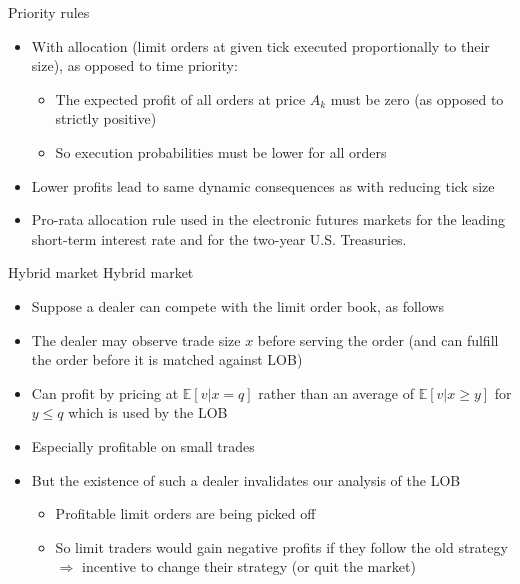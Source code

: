 \documentclass[english,10pt
,aspectratio=169
]{beamer}
\begin{document}
\begin{frame}{Priority rules}
	\begin{itemize}
		\item With  allocation (limit orders at given tick executed proportionally to their size), as opposed to \alert{time priority}:
		\begin{itemize}
			\item The expected profit of all orders at price $A_k$ must be zero (as opposed to strictly positive)
			\item So execution probabilities must be lower for all orders
		\end{itemize}
		\item Lower profits lead to same dynamic consequences as with reducing tick size
		\item Pro-rata allocation rule used in the electronic futures markets for the leading short-term interest rate and for the two-year U.S. Treasuries.
	\end{itemize}
\end{frame}


\begin{frame}{Hybrid market}
	Hybrid market
	\begin{itemize}
		\item Suppose a dealer can compete with the limit order book, as follows
		\item The dealer may observe trade size $x$ before serving the order (and can fulfill the order before it is matched against LOB)
		\item Can profit by pricing at $\mathbb{E}[v|x=q]$ rather than an average of $\mathbb{E}[v|x \geq y]$ for $y \leq q$ which is used by the LOB
		\item Especially profitable on small trades
		\item But the existence of such a dealer invalidates our analysis of the LOB
		\begin{itemize}
			\item Profitable limit orders are being picked off
			\item So limit traders would gain negative profits if they follow the old strategy $\Rightarrow$ incentive to change their strategy (or quit the market)
		\end{itemize}
	\end{itemize}
\end{frame}
\end{document}
